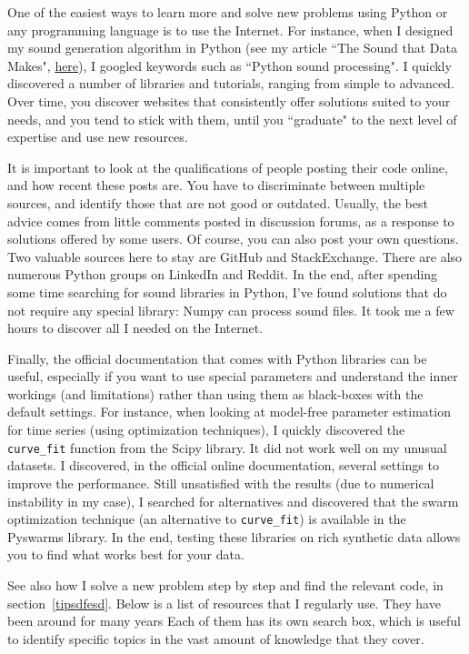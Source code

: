 \documentclass[oneside,10pt]{book}
\begin{document}
One of the easiest ways to learn more and solve new problems using Python or any programming language is to use the Internet. For instance, when I designed my 
 sound generation algorithm in Python (see my article ``The Sound that Data Makes", \href{https://mltechniques.com/2022/08/29/the-sound-that-data-makes/}{here}), I googled keywords such as ``Python sound processing". I quickly discovered a number of libraries and tutorials, ranging from simple to advanced.  Over time, you discover websites that consistently offer solutions suited to your needs, and you tend to stick with them, until you ``graduate" to the next level of expertise and use new resources. 

It is important to look at the qualifications of people posting their code online, and how recent these posts are. You have to discriminate between multiple sources, and identify those that are not good or outdated. Usually, the best advice comes from little comments posted in discussion forums, as a response to solutions offered by some users. Of course, you can also post your own questions. Two valuable sources here to stay are GitHub and StackExchange. There are also numerous Python groups on LinkedIn and Reddit. In the end, after spending some time searching for sound libraries in Python, I've found solutions that do not require any special library: Numpy can process sound files. It took me a few hours to discover all I needed on the Internet. 

Finally, the official documentation that comes with Python libraries can be useful, especially if you want to use special parameters and understand the inner workings (and limitations) rather than using them as black-boxes with the default settings. For instance, when looking at model-free parameter estimation for time series (using optimization techniques), I quickly discovered the 
  \texttt{curve\_fit} function from the Scipy library. It did not work well on my unusual datasets. I discovered, in the official online documentation, several settings 
 to improve the performance. Still unsatisfied with the results (due to numerical instability in my case), I searched for alternatives and discovered that the swarm optimization technique (an alternative to \texttt{curve\_fit}) is available in the Pyswarms library. In the end, testing these libraries on rich synthetic data allows you to find what works best for your data.  
 
See also how I solve a new problem step by step and find the relevant code, in section~\ref{tipsdfesd}. Below is a list of resources that I
 regularly use. They have been around for many years
 Each of them has its own search box, which is useful to identify specific topics in the vast amount of knowledge that they cover.
 \vspace{1ex}
\end{document}
